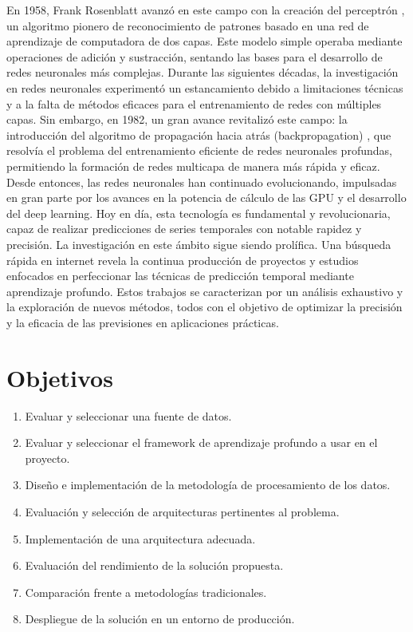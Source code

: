 En 1958, Frank Rosenblatt avanzó en este campo con la creación del perceptrón \cite{rosenblatt1958}, un algoritmo pionero de reconocimiento de patrones basado en una red de aprendizaje de computadora de dos capas.
Este modelo simple operaba mediante operaciones de adición y sustracción, sentando las bases para el desarrollo de redes neuronales más complejas.
Durante las siguientes décadas, la investigación en redes neuronales experimentó un estancamiento debido a limitaciones técnicas y a la falta de métodos eficaces para el entrenamiento de redes con múltiples capas. 
Sin embargo, en 1982, un gran avance revitalizó este campo: la introducción del algoritmo de propagación hacia atrás (backpropagation) \cite{werbos1982}, que resolvía el problema del entrenamiento eficiente de redes neuronales profundas, 
permitiendo la formación de redes multicapa de manera más rápida y eficaz.
Desde entonces, las redes neuronales han continuado evolucionando, impulsadas en gran parte por los avances en la potencia de cálculo de las GPU y el desarrollo del deep learning.
Hoy en día, esta tecnología es fundamental y revolucionaria, capaz de realizar predicciones de series temporales con notable rapidez y precisión.
La investigación en este ámbito sigue siendo prolífica. Una búsqueda rápida en internet revela la continua producción de proyectos y estudios enfocados 
en perfeccionar las técnicas de predicción temporal mediante aprendizaje profundo. Estos trabajos se caracterizan por un análisis exhaustivo y la exploración de nuevos métodos, 
todos con el objetivo de optimizar la precisión y la eficacia de las previsiones en aplicaciones prácticas.

\section{Objetivos}

\begin{enumerate}[label=\arabic*.] 
    \item Evaluar y seleccionar una fuente de datos.
    \item Evaluar y seleccionar el framework de aprendizaje profundo a usar en el proyecto.
    \item Diseño e implementación de la metodología de procesamiento de los datos.
    \item Evaluación y selección de arquitecturas pertinentes al problema.
    \item Implementación de una arquitectura adecuada.
    \item Evaluación del rendimiento de la solución propuesta.
    \item Comparación frente a metodologías tradicionales.
    \item Despliegue de la solución en un entorno de producción.
\end{enumerate}

\newpage
